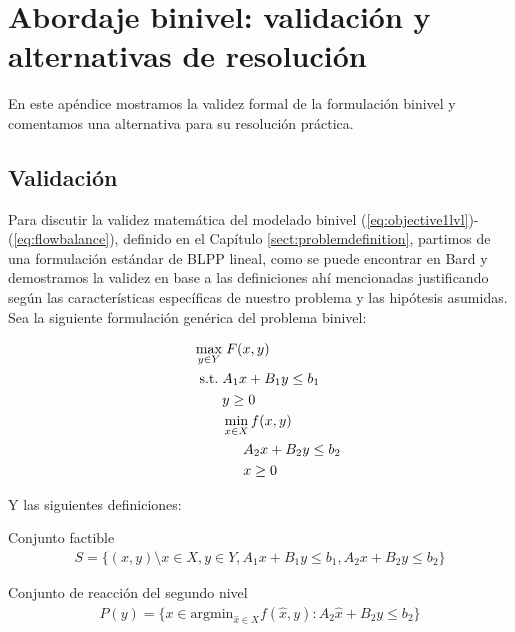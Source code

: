 \chapter{Abordaje binivel: validación y alternativas de resolución}
\label{sect:apendixbilevel}

En este apéndice mostramos la validez formal de la formulación binivel y comentamos una alternativa para su resolución práctica.

\section{Validación}
\label{sect:apendixbilevelvalidation}

Para discutir la validez matemática del modelado binivel (\ref{eq:objective1lvl})-(\ref{eq:flowbalance}), definido en el Capítulo \ref{sect:problemdefinition}, partimos de una formulación estándar de BLPP lineal, como se puede encontrar en Bard \textcite{bardbook} y demostramos la validez en base a las definiciones ahí mencionadas justificando según las características específicas de nuestro problema y las hipótesis asumidas. Sea la siguiente formulación genérica del problema binivel:

\begin{align}
\max_{y \in Y}            & \; F(x, y) \label{bilevelgeneric1} \\
\hspace{1.5em} \text{s.t.}\; & A_1 x + B_1 y \leq b_1 \\
                          & y \geq 0 \\
                          & \min_{x \in X} f(x, y) \\
                          & \hspace{1.5em} A_2 x + B_2 y \leq b_2 \label{bilevelgeneric5} \\
                          & \hspace{1.5em} x \geq 0 \label{bilevelgeneric6}
\end{align}

\clearpage
Y las siguientes definiciones:

\begin{definition}
Conjunto factible
\begin{align}
  S = \{(x, y) \setminus x \in X, y \in Y, A_1 x + B_1 y \leq b_1, A_2 x + B_2 y \leq b_2 \}
\end{align}
\end{definition}

\begin{definition}
Conjunto de reacción del segundo nivel
\begin{align}
  P(y) = \{ x \in \text{argmin}_{\hat{x} \in X} f(\hat{x}, y) : A_2 \hat{x} + B_2 y \leq b_2 \}
\end{align}
\end{definition}

